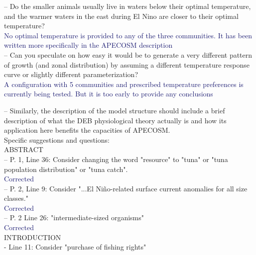 \documentclass[12pt]{article}
\newcommand{\resp}[1]{\textcolor{MidnightBlue}{#1}}
\begin{document}

-- Do the smaller animals usually live in waters below their optimal temperature, and the warmer waters in the east during El Nino are closer to their optimal temperature?\\

\resp{No optimal temperature is provided to any of the three communities. It has been written more specifically in the APECOSM description}\\

-- Can you speculate on how easy it would be to generate a very different pattern of growth (and zonal distribution) by assuming a different temperature response curve or slightly different parameterization?\\

\resp{A configuration with 5 communities and prescribed temperature preferences is currently being tested. But it is too early to provide any conclusions}

-- Similarly, the description of the model structure should include a brief description of what the DEB physiological theory actually is and how its application here benefits the capacities of APECOSM.\\


Specific suggestions and questions:\\

ABSTRACT\\

-- P. 1, Line 36: Consider changing the word "resource" to "tuna" or "tuna population distribution" or "tuna catch".\\

\resp{Corrected} \\

-- P. 2, Line 9: Consider "...El Niño-related surface current anomalies for all size classes."\\

\resp{Corrected}\\

-- P. 2 Line 26: "intermediate-sized organisms"\\

\resp{Corrected}\\

INTRODUCTION\\

- Line 11: Consider "purchase of fishing rights"\\
\end{document}
